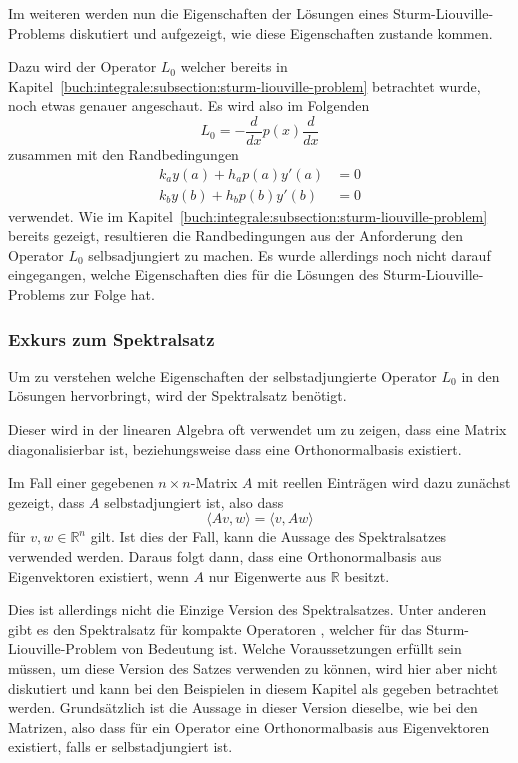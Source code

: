 Im weiteren werden nun die Eigenschaften der Lösungen eines
Sturm-Liouville-Problems diskutiert und aufgezeigt, wie diese Eigenschaften
zustande kommen.

Dazu wird der Operator $L_0$ welcher bereits in
Kapitel~\ref{buch:integrale:subsection:sturm-liouville-problem} betrachtet
wurde, noch etwas genauer angeschaut.
Es wird also im Folgenden
\[
    L_0
    =
    -\frac{d}{dx}p(x)\frac{d}{dx}
\]
zusammen mit den Randbedingungen
\[
    \begin{aligned}
        k_a y(a) + h_a p(a) y'(a) &= 0 \\
        k_b y(b) + h_b p(b) y'(b) &= 0
    \end{aligned}
\]
verwendet.
Wie im Kapitel~\ref{buch:integrale:subsection:sturm-liouville-problem} bereits 
gezeigt, resultieren die Randbedingungen aus der Anforderung den Operator $L_0$
selbsadjungiert zu machen.
Es wurde allerdings noch nicht darauf eingegangen, welche Eigenschaften dies
für die Lösungen des Sturm-Liouville-Problems zur Folge hat.

\subsubsection{Exkurs zum Spektralsatz}

Um zu verstehen welche Eigenschaften der selbstadjungierte Operator $L_0$ in 
den Lösungen hervorbringt, wird der Spektralsatz benötigt.

Dieser wird in der linearen Algebra oft verwendet um zu zeigen, dass eine Matrix
diagonalisierbar ist, beziehungsweise dass eine Orthonormalbasis existiert.

Im Fall einer gegebenen $n\times n$-Matrix $A$ mit reellen Einträgen wird dazu 
zunächst gezeigt, dass $A$ selbstadjungiert ist, also dass
\[
    \langle Av, w \rangle
    =
    \langle v, Aw \rangle
\]
für $ v, w \in \mathbb{R}^n$ gilt.
Ist dies der Fall, kann die Aussage des Spektralsatzes
\cite{sturmliouville:spektralsatz-wiki} verwended werden.
Daraus folgt dann, dass eine Orthonormalbasis aus Eigenvektoren existiert,
wenn $A$ nur Eigenwerte aus $\mathbb{R}$ besitzt.

Dies ist allerdings nicht die Einzige Version des Spektralsatzes.
Unter anderen gibt es den Spektralsatz für kompakte Operatoren
\cite{sturmliouville:spektralsatz-wiki}, welcher für das
Sturm-Liouville-Problem von Bedeutung ist.
Welche Voraussetzungen erfüllt sein müssen, um diese Version des
Satzes verwenden zu können, wird hier aber nicht diskutiert und kann bei den
Beispielen in diesem Kapitel als gegeben betrachtet werden.
Grundsätzlich ist die Aussage in dieser Version dieselbe, wie bei den Matrizen,
also dass für ein Operator eine Orthonormalbasis aus Eigenvektoren existiert,
falls er selbstadjungiert ist.

